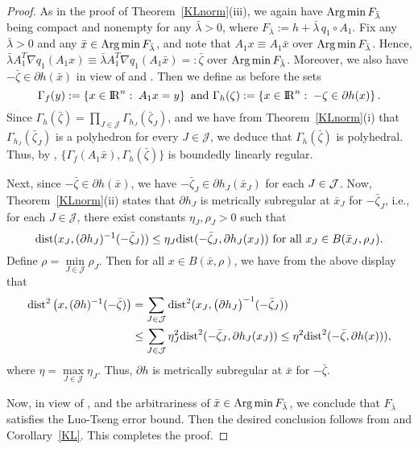 \documentclass[10pt]{article}
\numberwithin{equation}{section}
\def\R{{\rm I\!R}}
\def\Argmin{\mathop{\rm Arg\,min}}
\def\d{{\rm dist}}
\begin{document}
\begin{proof}
As in the proof of Theorem~\ref{KLnorm}(iii), we again have $\Argmin F_{\bar \lambda}$ being compact and nonempty for any $\bar\lambda > 0$, where $F_{\bar{\lambda}}:= h + \bar{\lambda}\, q_1\circ A_1$. Fix any $\bar \lambda > 0$ and any $\bar{x} \in\Argmin F_{\bar{\lambda}}$, and note that $A_1x\equiv A_1\bar x$ over $\Argmin F_{\bar{\lambda}}$. Hence, $\bar\lambda A_1^T\nabla q_1(A_1x)\equiv \bar\lambda A_1^T\nabla q_1(A_1\bar x)=: \bar{\zeta}$ over $\Argmin F_{\bar{\lambda}}$. Moreover, we also have $-\bar{\zeta}\in\partial h(\bar{x})$ in view of \cite[Theorem~10.1]{RoWe98} and \cite[Exercise~8.8(c)]{RoWe98}. Then we define as before the sets
\[
\Gamma_f(y):= \left\{x\in\R^n:\; A_1x = y\right\} \text{  and  } \Gamma_{h}(\zeta):= \left\{x\in\R^n:\; -\zeta\in\partial h(x)\right\}.
\]
Since $\Gamma_{h}(\bar{\zeta}) = \prod_{J\in\mathcal{J}}\Gamma_{h_J}(\bar{\zeta}_J)$, and we have from Theorem~\ref{KLnorm}(i) that $\Gamma_{h_J}(\bar{\zeta}_J)$ is a polyhedron for every $J\in\mathcal{J}$, we deduce that $\Gamma_{h}(\bar{\zeta})$ is polyhedral. Thus, by \cite[Corollary~3]{BaBL99}, $\{\Gamma_f(A_1\bar{x}), \Gamma_{h}(\bar{\zeta})\}$ is boundedly linearly regular.

Next, since $-\bar{\zeta}\in\partial h(\bar{x})$, we have $-\bar{\zeta}_J\in \partial h_J(\bar{x}_J)$ for each $J\in {\cal J}$.
Now, Theorem~\ref{KLnorm}(ii) states that $\partial h_J$ is metrically subregular at $\bar{x}_J$ for $-\bar{\zeta}_J$, i.e., for each $J\in\mathcal{J}$, there exist constants $\eta_J, \rho_J > 0$ such that
\[
\d(x_J, (\partial h_J)^{-1}(-\bar{\zeta}_J))\leq \eta_J\d(-\bar{\zeta}_J, \partial h_J(x_J)) \text{ for all } x_J\in B(\bar{x}_J, \rho_J).
\]
Define $\rho = \min\limits_{J\in\mathcal{J}}\rho_J$. Then for all $x\in B(\bar{x}, \rho)$, we have from the above display that
\[
\begin{aligned}
\d^2\left(x, (\partial h)^{-1}(-\bar{\zeta})\right)&= \sum_{J\in\mathcal{J}} \d^2(x_J, \big(\partial h_J\big)^{-1}(-\bar{\zeta}_J))\\
&\leq \sum_{J\in\mathcal{J}} \eta_J^2\d^2(-\bar{\zeta}_J, \partial h_J(x_J))\leq \eta^2\d^2(-\bar{\zeta}, \partial h(x))),
\end{aligned}
\]
where $\eta = \max\limits_{J\in\mathcal{J}} \eta_J$. Thus, $\partial h$ is metrically subregular at $\bar{x}$ for $-\bar{\zeta}$.

Now, in view of \cite[Theorem~2]{ZhSo17}, \cite[Corollary~1]{ZhSo17} and the arbitrariness of $\bar{x}\in\Argmin F_{\bar{\lambda}}$, we conclude that $F_{\bar{\lambda}}$ satisfies the Luo-Tseng error bound. Then the desired conclusion follows from \cite[Theorem~4.1]{LiPong18} and Corollary~\ref{KL}. This completes the proof.
\end{proof}
\end{document}
